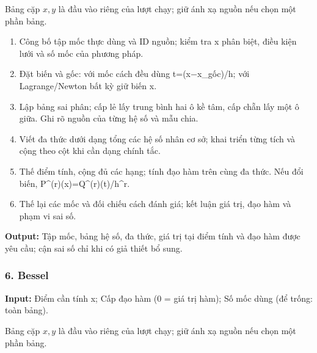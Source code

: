 Bảng cặp $x,y$ là đầu vào riêng của lượt chạy; giữ ánh xạ nguồn nếu chọn một phần bảng.

\begin{enumerate}

\item Công bố tập mốc thực dùng và ID nguồn;\allowbreak{} kiểm tra x phân biệt,\allowbreak{} điều kiện lưới và số mốc của phương pháp.

\item Đặt biến và gốc: với mốc cách đều dùng t=\allowbreak{}(\allowbreak{}x\ensuremath{-}x\_gốc)/\allowbreak{}h;\allowbreak{} với Lagrange/\allowbreak{}Newton bất kỳ giữ biến x.

\item Lập bảng sai phân;\allowbreak{} cấp lẻ lấy trung bình hai ô kề tâm,\allowbreak{} cấp chẵn lấy một ô giữa. Ghi rõ nguồn của từng hệ số và mẫu chia.

\item Viết đa thức dưới dạng tổng các hệ số nhân cơ sở;\allowbreak{} khai triển từng tích và cộng theo cột khi cần dạng chính tắc.

\item Thế điểm tính,\allowbreak{} cộng đủ các hạng;\allowbreak{} tính đạo hàm trên cùng đa thức. Nếu đổi biến,\allowbreak{} P\textasciicircum{}(\allowbreak{}r)(\allowbreak{}x)=\allowbreak{}Q\textasciicircum{}(\allowbreak{}r)(\allowbreak{}t)/\allowbreak{}h\textasciicircum{}r.

\item Thế lại các mốc và đối chiếu cách đánh giá;\allowbreak{} kết luận giá trị,\allowbreak{} đạo hàm và phạm vi sai số.

\end{enumerate}

\textbf{Output:} Tập mốc,\allowbreak{} bảng hệ số,\allowbreak{} đa thức,\allowbreak{} giá trị tại điểm tính và đạo hàm được yêu cầu;\allowbreak{} cận sai số chỉ khi có giả thiết bổ sung.

\examplebreak\subsubsection*{6. Bessel}

\textbf{Input:} Điểm cần tính x;\allowbreak{} Cấp đạo hàm (\allowbreak{}0 =\allowbreak{} giá trị hàm);\allowbreak{} Số mốc dùng (\allowbreak{}để trống: toàn bảng).

Bảng cặp $x,y$ là đầu vào riêng của lượt chạy; giữ ánh xạ nguồn nếu chọn một phần bảng.

